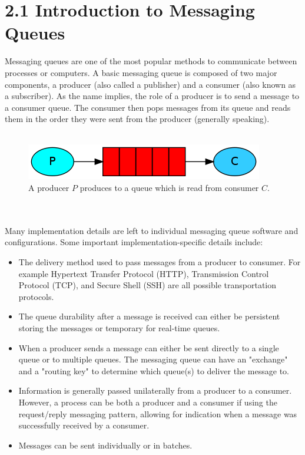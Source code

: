 \documentclass[12pt]{report}
\begin{document}
\newpage\thispagestyle{fancy}\sectionfont{\scshape}
\section*{2.1 Introduction to Messaging Queues}
\par\indent
Messaging queues are one of the most popular methods to communicate between processes or computers. A basic messaging queue is composed of two major components, a producer (also called a publisher) and a consumer (also known as a subscriber). As the name implies, the role of a producer is to send a message to a consumer queue. The consumer then pops messages from its queue and reads them in the order they were sent from the producer (generally speaking).
\\ \\
\begin{figure}[h]
\centering
\includegraphics{simple_queue}
\caption{A producer $P$ produces to a queue which is read from consumer $C$.}
\end{figure}
\\ \\
Many implementation details are left to individual messaging queue software and configurations. Some important implementation-specific details include:
\begin{itemize}
  \item The delivery method used to pass messages from a producer to consumer. For example Hypertext Transfer Protocol (HTTP), Transmission Control Protocol (TCP), and Secure Shell (SSH) are all possible transportation protocols.
  \item The queue durability after a message is received can either be persistent storing the messages or temporary for real-time queues.
  \item When a producer sends a message can either be sent directly to a single queue or to multiple queues. The messaging queue can have an "exchange" and a "routing key" to determine which queue(s) to deliver the message to. 
  \item Information is generally passed unilaterally from a producer to a consumer. However, a process can be both a producer and a consumer if using the request/reply messaging pattern, allowing for indication when a message was successfully received by a consumer.
  \item Messages can be sent individually or in batches.
\end{itemize}
 
\end{document}
